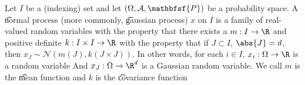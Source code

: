 

Let $I$ be a (indexing) set and let $(\Omega, \mathcal{A}, \mathbfsf{P})$ be a probability space.
A \t{normal process} (more commonly, \t{gaussian process}) $x$ on $I$ is a family of real-valued random variables with the property that there exists a $m: I \to \R$ and positive definite $k: I \times I \to \R$ with the property that if $J \subset I$, $\abs{J} = d$, then $x_J \sim \mathcal{N}(m(J), k(J \times J))$.
In other words, for each $i \in I$, $x_i: \Omega \to \R$ is a random variable
And $x_J: \Omega \to \R^d$ is a Gaussian random variable.
We call $m$ is the \t{mean function} and $k$ is the \t{covariance function}

\blankpage
